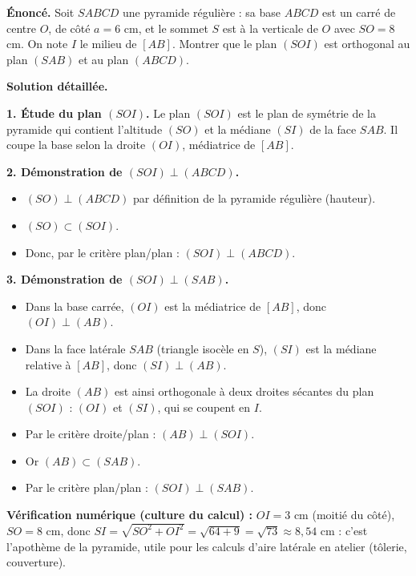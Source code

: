 \documentclass[11pt]{article}
\begin{document}
\begin{exoresolu}
\textbf{Énoncé.} Soit $SABCD$ une pyramide régulière : sa base $ABCD$ est un carré de centre $O$, de côté $a = 6$ cm, et le sommet $S$ est à la verticale de $O$ avec $SO = 8$ cm. On note $I$ le milieu de $[AB]$.
Montrer que le plan $(SOI)$ est orthogonal au plan $(SAB)$ et au plan $(ABCD)$.

\tcblower
\textbf{Solution détaillée.}

\textbf{1. Étude du plan $(SOI)$.}
Le plan $(SOI)$ est le plan de symétrie de la pyramide qui contient l'altitude $(SO)$ et la médiane $(SI)$ de la face $SAB$. Il coupe la base selon la droite $(OI)$, médiatrice de $[AB]$.

\textbf{2. Démonstration de $(SOI) \perp (ABCD)$.}
\begin{itemize}
  \item $(SO) \perp (ABCD)$ par définition de la pyramide régulière (hauteur).
  \item $(SO) \subset (SOI)$.
  \item Donc, par le critère plan/plan : $(SOI) \perp (ABCD)$.
\end{itemize}

\textbf{3. Démonstration de $(SOI) \perp (SAB)$.}
\begin{itemize}
  \item Dans la base carrée, $(OI)$ est la médiatrice de $[AB]$, donc $(OI) \perp (AB)$.
  \item Dans la face latérale $SAB$ (triangle isocèle en $S$), $(SI)$ est la médiane relative à $[AB]$, donc $(SI) \perp (AB)$.
  \item La droite $(AB)$ est ainsi orthogonale à deux droites sécantes du plan $(SOI)$ : $(OI)$ et $(SI)$, qui se coupent en $I$.
  \item Par le critère droite/plan : $(AB) \perp (SOI)$.
  \item Or $(AB) \subset (SAB)$.
  \item Par le critère plan/plan : $(SOI) \perp (SAB)$.
\end{itemize}

\textbf{Vérification numérique (culture du calcul) :} $OI = 3$ cm (moitié du côté), $SO = 8$ cm, donc $SI = \sqrt{SO^2 + OI^2} = \sqrt{64+9} = \sqrt{73} \approx 8{,}54$ cm : c'est l'apothème de la pyramide, utile pour les calculs d'aire latérale en atelier (tôlerie, couverture).
\end{exoresolu}
\end{document}
